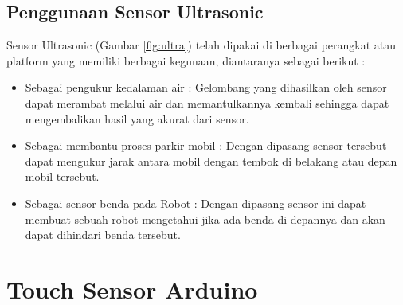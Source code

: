 \subsection{Penggunaan Sensor Ultrasonic}
Sensor Ultrasonic (Gambar \ref{fig:ultra}) telah dipakai di berbagai perangkat atau platform yang memiliki berbagai kegunaan, diantaranya sebagai berikut : 
\begin{itemize}
	\item Sebagai pengukur kedalaman air : Gelombang yang dihasilkan oleh sensor dapat merambat melalui air dan memantulkannya kembali sehingga dapat mengembalikan hasil yang akurat dari sensor.
	\item Sebagai membantu proses parkir mobil :  Dengan dipasang sensor tersebut dapat mengukur jarak antara mobil dengan tembok di belakang atau depan mobil tersebut.
	\item Sebagai sensor benda pada Robot : Dengan dipasang sensor ini dapat membuat sebuah robot mengetahui jika ada benda di depannya dan akan dapat dihindari benda tersebut.
\end{itemize}

\section{Touch Sensor Arduino}
